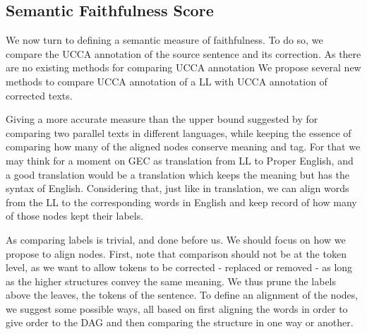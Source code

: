 		
		
		\subsection{Semantic Faithfulness Score}
		
		
		
		
		
		We now turn to defining a semantic measure of faithfulness. 
		To do so, we compare the UCCA annotation of the source sentence and its correction. 
		As there are no existing methods for comparing UCCA annotation 
		We propose several new methods to compare UCCA annotation of a LL with UCCA annotation of corrected texts.
		
		Giving a more accurate
		measure than the upper bound suggested by \cite{sulem2015conceptual} for
		comparing two parallel texts in different languages, while keeping
		the essence of comparing how many of the aligned nodes conserve meaning and tag. For that we may think for a moment on GEC as
		translation from LL to Proper English, and a good translation
		would be a translation which keeps the meaning but has the syntax
		of English. Considering that, just like in translation, we can align words from the LL to the corresponding words in English
		and keep record of how many of those nodes kept their labels.
		
		As comparing labels is trivial, and done before us. We should focus on how we propose to align nodes. 
		First, note that comparison should not be at
		the token level, as we want to allow tokens to be corrected - replaced or removed -
		as long as the higher structures convey the same meaning. We thus
		prune the labels above the leaves, the tokens of the sentence. To
		define an alignment of the nodes, we suggest some possible ways, all
		based on first aligning the words in order to give order to the DAG and then comparing the structure in one way or another.
		
